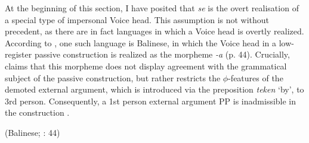 \documentclass[output=paper,
modfonts,nonflat,
newtxmath
]{langsci/langscibook}
\begin{document}
\begin{exe}
\ex \begin{xlist}
 \label{ex:lenardic: 26a}
 \label{ex:lenardic: 26b}
\end{xlist}
\end{exe} \par

\noindent At the beginning of this section, I have posited that \textit{se} is the overt realisation of a special type of impersonal Voice head. This assumption is not without precedent, as there are in fact languages in which a Voice head is overtly realized. According to \citet{legate2014}, one such language is Balinese, in which the Voice head in a low-register passive construction is realized as the morpheme \textit{-a} (p. 44). Crucially, \citet{legate2014} claims that this morpheme does not display agreement with the grammatical subject of the passive construction, but rather restricts the $\phi$-features of the demoted external argument, which is introduced via the preposition \textit{teken} `by', to 3rd person. Consequently, a 1st person external argument PP is inadmissible in the construction .

\begin{exe}
\ex \begin{xlist}
\label{ex:lenardic: 27a}
\hfill (Balinese; \citealt{legate2014}: 44)\label{ex:lenardic: 27b}
\end{xlist}
\end{exe}\par
\end{document}
